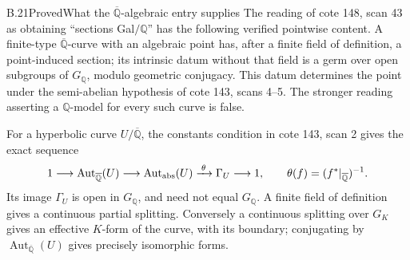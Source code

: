 \begin{statement}{B.21}{Proved}{What the $\overline{\mathbb Q}$-algebraic entry supplies}
The reading of cote 148, scan 43 as obtaining ``sections Gal$/\mathbb Q$''
has the following verified pointwise content.  A finite-type
$\overline{\mathbb Q}$-curve with an algebraic point has, after a
finite field of definition, a point-induced section; its intrinsic
datum without that field is a germ over open subgroups of
$G_{\mathbb Q}$, modulo geometric conjugacy.  This datum determines
the point under the semi-abelian hypothesis of cote 143, scans 4--5.
The stronger reading asserting a $\mathbb Q$-model for every such
curve is false.

For a hyperbolic curve $U/\overline{\mathbb Q}$, the
constants condition in cote 143, scan 2 gives the exact sequence
\[
 1\longrightarrow\operatorname{Aut}_{\overline{\mathbb Q}}(U)
 \longrightarrow\operatorname{Aut}_{\rm abs}(U)
 \xrightarrow{\;\theta\;}\Gamma_U\longrightarrow1,
 \qquad
 \theta(f)=(f^*|_{\overline{\mathbb Q}})^{-1}.
\]
Its image $\Gamma_U$ is open in $G_{\mathbb Q}$, and need not
equal $G_{\mathbb Q}$. A finite field of definition gives a
continuous partial splitting. Conversely a continuous splitting
over $G_K$ gives an effective $K$-form of the curve, with its
boundary; conjugating by
$\operatorname{Aut}_{\overline{\mathbb Q}}(U)$ gives precisely
isomorphic forms.
\end{statement}
